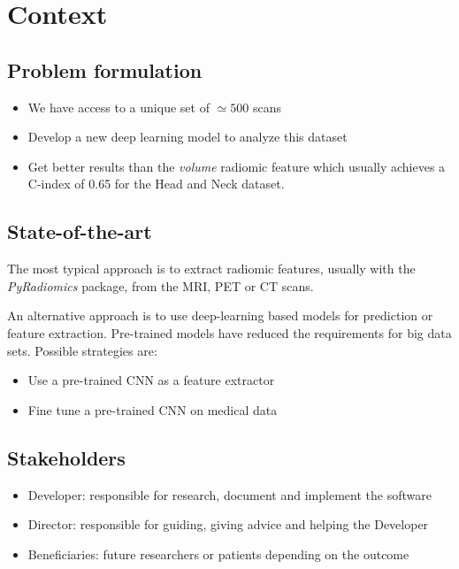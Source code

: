 \section{Context}
\subsection{Problem formulation}
\begin{frame}{\insertsubsec}
  \begin{itemize}
    \item We have access to a unique set of \( \simeq 500 \) scans
    \item Develop a new deep learning model to analyze this dataset
    \item Get better results than the \emph{volume} radiomic feature which usually achieves
    a C-index of 0.65 for the Head and Neck dataset. 
  \end{itemize}
\end{frame}

\subsection{State-of-the-art}
\begin{frame}{\insertsubsec}
  The most typical approach is to extract radiomic features, usually with
  the \emph{PyRadiomics} package, from the MRI, PET or CT scans.

  \vspace{.5cm}
  An alternative approach is to use deep-learning based models for prediction or 
  feature extraction. Pre-trained models have reduced the requirements for big data sets.
  Possible strategies are:
  \begin{itemize}
    \item Use a pre-trained CNN as a feature extractor
    \item Fine tune a pre-trained CNN on medical data
  \end{itemize}
  
\end{frame}

\subsection{Stakeholders}
\begin{frame}{\insertsubsec}
  \begin{itemize}
    \item Developer: responsible for research, document and implement the software
    \item Director: responsible for guiding, giving advice and helping the Developer
    \item Beneficiaries: future researchers or patients depending on the outcome
  \end{itemize}
\end{frame}

